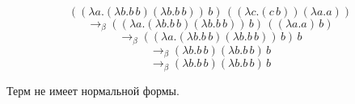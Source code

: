 \documentclass{article}
\begin{document}
\[
((\lambda a.(\lambda b.b\,b)(\lambda b.b\,b))\,b)\,((\lambda c.(c\,b))(\lambda a.a))
\]
\[
\to_\beta ((\lambda a.(\lambda b.b\,b)(\lambda b.b\,b))\,b)\,((\lambda a.a)\,b)
\]
\[
\to_\beta ((\lambda a.(\lambda b.b\,b)(\lambda b.b\,b))\,b)\,b
\]
\[
\to_\beta (\lambda b.b\,b)(\lambda b.b\,b)\,b
\]
\[
\to_\beta (\lambda b.b\,b)(\lambda b.b\,b)\,b
\]

Терм не имеет нормальной формы.
\end{document}
